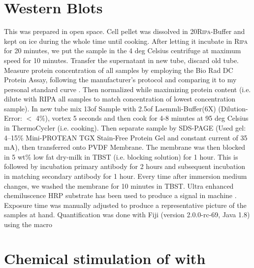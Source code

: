 \section{Western Blots}
This was prepared in open space. 
Cell pellet was dissolved in 20\mul \textsc{Ripa}-Buffer and kept on ice during the whole time until cooking. After letting it incubate in \textsc{Ripa} for 20 minutes, we put the sample in the 4 deg Celsius centrifuge at maximum speed for 10 minutes. Transfer the supernatant in new tube, discard old tube. Measure protein concentration of all samples by employing the Bio Rad DC Protein Assay, following the manufacturer's protocol and comparing it to my personal standard curve . Then normalized while maximizing protein content (i.e. dilute with RIPA all samples to match concentration of lowest concentration sample). In new tube mix 13\mul{ }of Sample with 2.5\mul{ }of Laemmli-Buffer(6X) (Dilution-Error: $<$ 4\%), vortex 5 seconds and then cook for 4-8 minutes at 95 deg Celsius in ThermoCycler (i.e. cooking). Then separate sample by SDS-PAGE (Used gel: 4–15\% Mini-PROTEAN TGX Stain-Free Protein Gel  and constant current of 35 mA), then transferred onto PVDF Membrane. The membrane was then blocked in 5 wt\% low fat dry-milk in TBST (i.e. blocking solution) for 1 hour. This is followed by incubation primary antibody for 2 hours and subsequent incubation in matching secondary antibody for 1 hour. Every time after immersion medium changes, we washed the membrane for 10 minutes in TBST. Ultra enhanced chemiluscence HRP substrate  has been used to produce a signal in machine . Exposure time was manually adjusted to produce a representative picture of the samples at hand. Quantification was done with Fiji (version 2.0.0-rc-69, Java 1.8) using the macro 



\section{Chemical stimulation of \Piezo with \Yoda}

